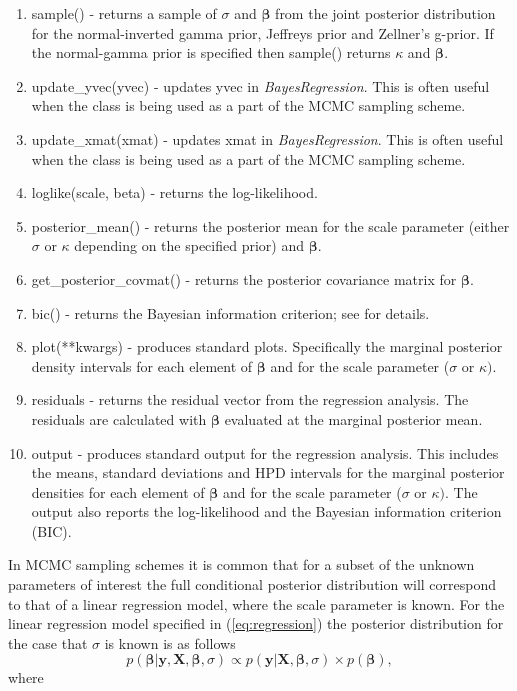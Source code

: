 \documentclass[article]{jss}
\begin{document}
\begin{enumerate}
\item sample() - returns a sample of $\sigma$ and $\bm{\beta}$ from
  the joint posterior distribution for the normal-inverted gamma
  prior, Jeffreys prior and Zellner's g-prior. If the normal-gamma
  prior is specified then sample() returns $\kappa$ and $\bm{\beta}.$
\item update\_yvec(yvec) - updates yvec in \emph{BayesRegression}. This
  is often useful when the class is being used as a part of the MCMC
  sampling scheme.
\item update\_xmat(xmat) - updates xmat in \emph{BayesRegression}. This
  is often useful when the class is being used as a part of the MCMC
  sampling scheme.
\item loglike(scale, beta) - returns the log-likelihood.
\item posterior\_mean() - returns the posterior mean for the scale parameter
(either $\sigma$ or $\kappa$ depending on the specified prior) and
$\bm{\beta}.$
\item get\_posterior\_covmat() - returns the posterior covariance matrix
for $\bm{\beta}$.
\item bic() - returns the Bayesian information criterion; see \cite{KassRaftery1995} for details.
\item plot({*}{*}kwargs) - produces standard plots. Specifically the
  marginal posterior density intervals for each element of
  $\bm{\beta}$ and for the scale parameter ($\sigma$ or $\kappa)$.
\item residuals - returns the residual vector from the regression
  analysis.  The residuals are calculated with $\bm{\beta}$ evaluated
  at the marginal posterior mean.
\item output - produces standard output for the regression analysis.
  This includes the means, standard deviations and HPD intervals for
  the marginal posterior densities for each element of $\bm{\beta}$
  and for the scale parameter ($\sigma$ or $\kappa)$. The output also
  reports the log-likelihood and the Bayesian information criterion
  (BIC).
\end{enumerate}
In MCMC sampling schemes it is common that for a subset of the unknown
parameters of interest the full conditional posterior distribution
will correspond to that of a linear regression model, where the scale
parameter is known. For the linear regression model specified in
(\ref{eq:regression}) the posterior distribution for the case that
$\sigma$ is known is as follows
\begin{equation} 
p\left(\bm{\beta}|\bm{y},\bm{X},\bm{\beta},\sigma\right)\propto
  p(\bm{y}|\bm{X},\bm{\beta},\sigma)\times
  p(\bm{\beta}),\label{eq:post_condbeta}
\end{equation} where
\end{document}
